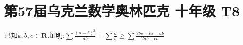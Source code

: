 \documentclass[]{article}
\title{}
\author{}
\date{}
\begin{document}
\maketitle
\section{第57届乌克兰数学奥林匹克 十年级 T8}{
已知$a,b,c \in \mathbf{R}$.证明:$\displaystyle \sum \frac{(a-b)^2}{ab}+\sum \frac{a}{b} \geq \sum \frac{3bc+ca-ab}{2ab+ca}$

}
\end{document}
